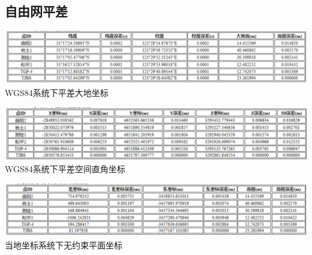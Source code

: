 \documentclass[a4paper,16pt,UTF8]{article}
\begin{document}
\subsection{\Large 自由网平差}

\begin{center}
        
    \includegraphics[scale = 0.55]{cgo2.png}
    WGS84系统下平差大地坐标
    
    \includegraphics[scale = 0.55]{cgo3.png}
    WGS84系统下平差空间直角坐标

    \includegraphics[scale = 0.55]{cgo4.png}
    当地坐标系统下无约束平面坐标
\end{center}
\end{document}
